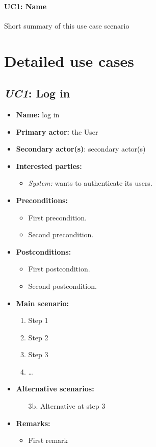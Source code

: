 \documentclass[english]{sareport}
\begin{document}
\paragraph{UC1: Name}
Short summary of this use case scenario

\section{Detailed use cases}
\subsection{\emph{UC1}: Log in}
\begin{itemize}
    \item \textbf{Name:} log in
    \item \textbf{Primary actor:} the User
    \item \textbf{Secondary actor(s)}: secondary actor(s)
    \item \textbf{Interested parties:} 
        \begin{itemize}
            \item \textit{System:} wants to authenticate its users.
        \end{itemize}

    \item \textbf{Preconditions:}
        \begin{itemize}
            \item First precondition.
            \item Second precondition.
        \end{itemize}

    \item \textbf{Postconditions:}
        \begin{itemize}
            \item First postcondition.
            \item Second postcondition.
        \end{itemize}
        
    \item \textbf{Main scenario:} 
    \begin{enumerate}
       \item Step 1
       \item Step 2
       \item Step 3
       \item \ldots
    \end{enumerate}

    \item \textbf{Alternative scenarios:} 
    \begin{enumerate}
        \item [3b.] Alternative at step 3
    \end{enumerate}
    
    \item \textbf{Remarks:}
        \begin{itemize}
            \item First remark
        \end{itemize}
\end{itemize}
\end{document}
